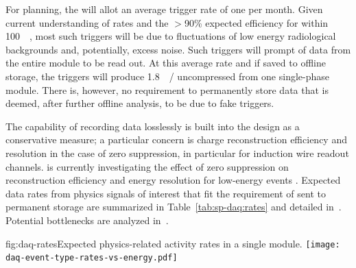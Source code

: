 For planning, the  will allot an average  trigger rate of one per month.
Given current understanding of  rates and the $>$90\% expected efficiency for  within \SI{100}{\kilo\parsec}, most such triggers will be due to fluctuations of low energy radiological backgrounds and, potentially, excess noise.
Such triggers will prompt \snbtime of data from the entire module to be read out.
At this average rate and if saved to offline storage, the 
triggers will produce \SI{1.8}{\peta\byte/\year} uncompressed from one
single-phase module. There is, however, no requirement to
permanently store 
data that is deemed, after further offline analysis, to be due to fake triggers.

The capability of recording data losslessly is built into the design
as a conservative measure; a particular concern is charge reconstruction
efficiency and resolution in the case of zero suppression, in particular for 
induction wire readout channels.
 is currently investigating the effect of zero suppression
on reconstruction efficiency and energy resolution for low-energy
events \cite{bib:uBsnreadout2019}.
Expected data rates from physics signals of interest that fit the
requirement of \offsitepbpy sent to permanent storage are summarized in Table~\ref{tab:sp-daq:rates} and detailed in~. Potential bottlenecks are analyzed in~.

\begin{dunefigure}{fig:daq-rates}{Expected physics-related activity
    rates in a single \nominalmodsize module. \label{sec:fd-daq:rates}
}
  \texttt{[image: daq-event-type-rates-vs-energy.pdf]}
\end{dunefigure}

